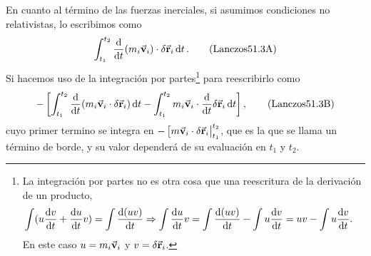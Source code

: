 \documentclass[12pt, spanish, a4paper, ]{article}
\begin{document}
En cuanto al término de las fuerzas inerciales, si asumimos condiciones no relativistas, lo escribimos como 
\begin{equation}\label{Lanczos51.3A}
	\int^{t_2}_{t_1} \dv{t} \pqty{m_i \va{v}_i} \cdot \delta \va{r}_i \dd{t}.
	\tag{Lanczos51.3A}
\end{equation} 
Si hacemos uso de la integración por partes\footnote{\label{integraciónPartes}La integración por partes no es otra cosa que una reescritura de la derivación de un producto, 
\begin{align}
	\int (u \dv{v}{t}+ \dv{u}{t} v) & = \int \dv{(u v)}{t} \Rightarrow
	\int \dv{u}{t} v = \int \dv{(u v)}{t} - \int u \dv{v}{t}
	=
	u v - \int u \dv{v}{t}
	.
\end{align}
En este caso \(u= m_i \va{v}_i\) y \(v= \delta \va{r}_i\).
} para reescribirlo como
\begin{equation}\label{Lanczos51.3B}
- \left[ \int^{t_2}_{t_1} \dv{t} \pqty{ m_i \va{v}_i  \cdot \delta \va{r}_i } \dd{t} - \int^{t_2}_{t_1} m_i \va{v}_i \cdot \dv{t} \delta \va{r}_i \dd{t} \right],
	\tag{Lanczos51.3B}
\end{equation}
cuyo primer termino se integra en \(- \eval[ m \va{v}_i \cdot \delta \va{r}_i |^{t_2}_{t_1}\), que es la que se llama un término de borde, y su valor dependerá de su evaluación en \(t_1\) y \(t_2\).
\end{document}
